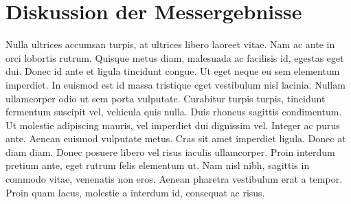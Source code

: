 \chapter{Diskussion der Messergebnisse}

  Nulla ultrices accumsan turpis, at ultrices libero laoreet vitae. Nam ac ante in orci lobortis rutrum. Quisque metus diam, malesuada ac facilisis id, egestas eget dui. Donec id ante et ligula tincidunt congue. Ut eget neque eu sem elementum imperdiet. In euismod est id massa tristique eget vestibulum nisl lacinia. Nullam ullamcorper odio ut sem porta vulputate. Curabitur turpis turpis, tincidunt fermentum suscipit vel, vehicula quis nulla. Duis rhoncus sagittis condimentum. Ut molestie adipiscing mauris, vel imperdiet dui dignissim vel. Integer ac purus ante. Aenean euismod vulputate metus. Cras sit amet imperdiet ligula. Donec at diam diam. Donec posuere libero vel risus iaculis ullamcorper. Proin interdum pretium ante, eget rutrum felis elementum ut. Nam nisl nibh, sagittis in commodo vitae, venenatis non eros. Aenean pharetra vestibulum erat a tempor. Proin quam lacus, molestie a interdum id, consequat ac risus.